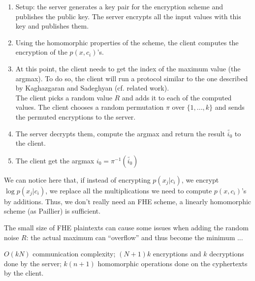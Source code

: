 \documentclass[11pt]{article}
\begin{document}
	\begin{enumerate}
		\item Setup: the server generates a key pair for the encryption scheme and publishes the public key. The server encrypts all the input values with this key and publishes them.
		
		\item Using the homomorphic properties of the scheme, the client computes the encryption of the $p(x,c_i)$'s.
		
		\item At this point, the client needs to get the index of the maximum value (the argmax). To do so, the client will run a protocol similar to the one described by Kaghazgaran and Sadeghyan (cf. related work).\\
		The client picks a random value $R$ and adds it to each of the computed values. The client chooses a random permutation $\pi$ over $\{1,...,k\}$ and sends the permuted encryptions to the server.
		\\                                                                     
		
		\item The server decrypts them, compute the argmax and return the result $\tilde{i_0}$ to the client.
		
		\item The client get the argmax $i_0 = \pi^{-1}(\tilde{i_0})$  
	\end{enumerate}
	
	We can notice here that, if instead of encrypting $p(x_j|c_i)$, we encrypt $\log p(x_j|c_i)$, we replace all the multiplications we need to compute $p(x,c_i)$'s by additions. Thus, we don't really need an FHE scheme, a linearly homomorphic scheme (as Paillier) is sufficient. 
	
	The small size of FHE plaintexts can cause some issues when adding the random noise $R$: the actual maximum can ``overflow'' and thus become the minimum ...
	
	$O(kN)$ communication complexity; $(N+1)k$ encryptions and $k$ decryptions done by the server; $k(n+1)$ homomorphic operations done on the cyphertexts by the client.
	
	  
          
\end{document}
